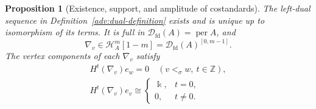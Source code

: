 \documentclass[11pt,a4paper]{article}
\newcommand{\D}{\mathcal D}
\renewcommand{\H}{\mathcal H}
\newcommand{\ZZ}{\mathbb{Z}}
\newcommand{\costd}{\nabla}
\DeclareMathOperator{\fd}{fd}
\DeclareMathOperator{\per}{per}
\theoremstyle{plain}
\newtheorem{proposition}[theorem]{Proposition}
\theoremstyle{definition}
\numberwithin{equation}{section}
\begin{document}
\begin{proposition}[Existence, support, and amplitude of costandards]
\label{adv:costandards}
The left-dual sequence in Definition~\ref{adv:dual-definition} exists
and is unique up to isomorphism of its terms. It is full in
$\D_{\fd}(A)=\per A$, and
\begin{equation}\label{adv:costandard-window}
 \costd_v\in\H_A^m[1-m]
 =\D_{\fd}(A)^{[0,m-1]}.
\end{equation}
The vertex components of each $\costd_v$ satisfy
\begin{equation}\label{adv:costandard-support}
 \begin{gathered}
 H^t(\costd_v)e_w=0\quad(v<_\sigma w,\ t\in\ZZ),\\
 H^t(\costd_v)e_v\cong
 \begin{cases}\Bbbk,&t=0,\\0,&t\neq0.\end{cases}
 \end{gathered}
\end{equation}
\end{proposition}
\end{document}
